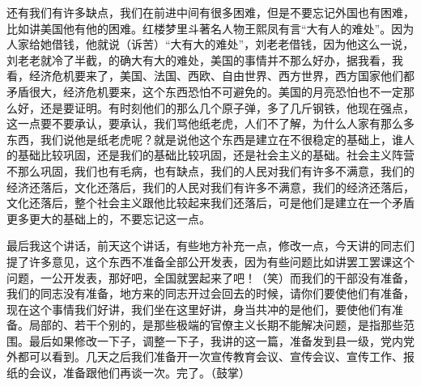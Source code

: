 还有我们有许多缺点，我们在前进中间有很多困难，但是不要忘记外国也有困难，比如讲美国他有他的困难。红楼梦里斗著名人物王熙凤有言“大有人的难处”。因为人家给她借钱，他就说（诉苦）“大有大的难处”，刘老老借钱，因为他这么一说，刘老老就冷了半截，的确大有大的难处，美国的事情并不那么好办，据我看，我看，经济危机要来了，美国、法国、西欧、自由世界、西方世界，西方国家他们都矛盾很大，经济危机要来，这个东西恐怕不可避免的。美国的月亮恐怕也不一定那么好，还是要证明。有时刻他们的那么几个原子弹，多了几斤钢铁，他现在强点，这一点要不要承认，要承认，我们骂他纸老虎，人们不了解，为什么人家有那么多东西，我们说他是纸老虎呢？就是说他这个东西是建立在不很稳定的基础上，谁人的基础比较巩固，还是我们的基础比较巩固，还是社会主义的基础。社会主义阵营不那么巩固，我们也有毛病，也有缺点，我们的人民对我们有许多不满意，我们的经济还落后，文化还落后，我们的人民对我们有许多不满意，我们的经济还落后，文化还落后，整个社会主义跟他比较起来我们还落后，可是他们是建立在一个矛盾更多更大的基础上的，不要忘记这一点。

最后我这个讲话，前天这个讲话，有些地方补充一点，修改一点，今天讲的同志们提了许多意见，这个东西不准备全部公开发表，因为有些问题比如讲罢工罢课这个问题，一公开发表，那好吧，全国就罢起来了吧！（笑）而我们的干部没有准备，我们的同志没有准备，地方来的同志开过会回去的时候，请你们要使他们有准备，现在这个事情我们好讲，我们坐在这里好讲，身当共冲的是他们，要使他们有准备。局部的、若干个别的，是那些极端的官僚主义长期不能解决问题，是指那些范围。最后如果修改一下子，调整一下子，我讲的这一篇，准备发到县一级，党内党外都可以看到。几天之后我们准备开一次宣传教育会议、宣传会议、宣传工作、报纸的会议，准备跟他们再谈一次。完了。（鼓掌）


